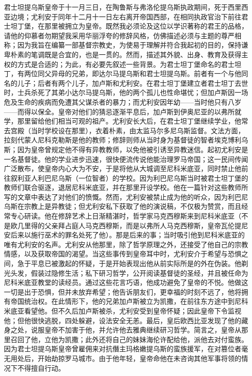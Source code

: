 君士坦提乌斯皇帝于十一月三日，在陶鲁斯与弗洛伦提乌斯执政期间，死于西里西亚边境；尤利安于同年十二月十一日左右离开帝国西部，在相同执政官治下前往君士坦丁堡，在那里被拥立为皇帝。既然我必须论及这位以学识著称的君王的品格，请他的仰慕者勿期望我采用华丽浮夸的修辞风格，仿佛描述必须与主题的尊严相称；因为我旨在编纂一部基督宗教史，为使易于理解并符合我起初的目的，保持谦卑朴素的笔调既是合宜的，也是一贯的。然而，描述其外貌、出身、教育及获得主权的方式是合适的；为此，有必要先叙述一些背景。为君士坦丁堡命名的君士坦丁，有两位同父异母的兄弟，即达尔马提乌斯和君士坦提乌斯。前者有一个与他同名的儿子；后者有两个儿子，加卢斯和尤利安。在君士坦丁堡建立者君士坦丁去世时，士兵杀死了其弟小达尔马提乌斯，他的两个孤儿也性命堪忧；但加卢斯因一场危及生命的疾病而免遭其父谋杀者的暴力；而尤利安因年幼——当时他只有八岁——而得以保全。皇帝对他们的猜忌逐渐平息后，加卢斯到伊奥尼亚的以弗所就学，那里留给他们相当可观的祖产。尤利安长大后，在君士坦丁堡继续学业，他常去宫殿（当时学校设在那里），衣着朴素，由太监马尔多尼乌斯监督。文法方面，拉刻代蒙人尼科克勒斯是他的教师；修辞则师从当时身为基督徒的智者埃克博利乌斯；因为皇帝曾规定他不得有异教教师，以免他被引诱至异教迷信。起初尤利安是一名基督徒。他的学业进步迅速，很快便流传说他能治理罗马帝国；这一民间传闻广泛散布，使皇帝内心大为不安，于是将他从大城调至尼科米底亚，同时禁止他前往叙利亚人利巴尼乌斯（一位智者）的学校。因为利巴尼乌斯当时被君士坦丁堡的教师们联合驱逐，退居尼科米底亚，并在那里开设学校。他在一篇针对这些教师所写的文章中表达了对他们的愤慨。然而，尤利安被禁止成为他的听众，因为利巴尼乌斯在宗教上是异教徒；但尤利安私下获取了他的演说稿，不仅极为赞赏，而且经常专心研读。他在修辞艺术上日渐精湛时，哲学家马克西穆斯来到尼科米底亚（不是欧几里得的父亲拜占庭人马克西穆斯，而是以弗所人马克西穆斯，皇帝瓦伦提尼安后来以施行巫术的罪名处死了他）。那是后来的事；当时吸引他到尼科米底亚的唯有尤利安的名声。尤利安从他那里，除了哲学原理之外，还接受了他自己的宗教情感，以及获取帝国的渴望。当这些事传到皇帝耳中时，尤利安介于希望与恐惧之间，急于平息已被激起的怀疑，于是开始表现出他从前实际所是的外在伪装。他剃光头发，假装过隐修生活；私下研习哲学，公开阅读基督徒的圣经，并且被任命为尼科米底亚教堂的读经员。通过这些花言巧语，他成功避免了皇帝的不悦。他做这一切是出于恐惧，但并未放弃希望；他告诉朋友们，更幸福的时刻不远了，他将拥有帝国统治权。在此情形下，他的兄弟加卢斯被立为凯撒，在前往东方途中到尼科米底亚看望他。但不久后加卢斯被杀，尤利安受到皇帝怀疑；因此皇帝下令监视他；但他很快逃脱，四处躲避，设法安全无恙。最后，皇后欧西比亚发现了他的藏身之处，说服皇帝不加害于他，并允许他去雅典继续研习哲学。简言之，皇帝从那里召回了他，立他为凯撒；此外还将自己的妹妹海伦许配给他，派他去对付蛮族。因为君士坦提乌斯皇帝曾雇佣来对抗僭主玛格嫩提乌斯的蛮族援军，在对篡位者毫无用处后，开始劫掠罗马城市。由于他年轻，皇帝命他在未咨询其他军事将领的情况下不得擅自行动。\par


